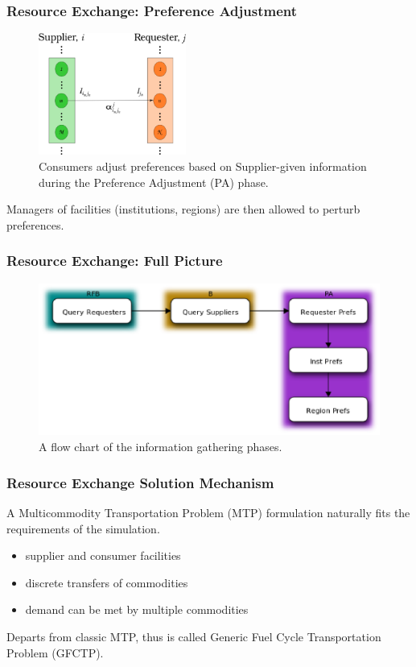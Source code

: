 \begin{frame}[ctb!]
  \frametitle{Resource Exchange: Preference Adjustment}
  \begin{figure}
    \includegraphics[height=4cm]{./images/supplier-requester.eps}
    \caption{Consumers adjust preferences based on Supplier-given information
      during the Preference Adjustment (PA) phase.}
  \end{figure}

  Managers of facilities (institutions, regions) are then allowed to perturb
  preferences.
\end{frame}

\begin{frame}[ctb!]
  \frametitle{Resource Exchange: Full Picture}
  \begin{figure}
    \includegraphics[height=5cm]{./images/exchange.eps}
    \caption{A flow chart of the information gathering phases.}
  \end{figure}
\end{frame}

\begin{frame}[ctb!]
  \frametitle{Resource Exchange Solution Mechanism}

  A Multicommodity Transportation Problem (MTP) formulation naturally fits the
  requirements of the simulation.

  \begin{itemize}
    \item supplier and consumer facilities
    \item discrete transfers of commodities
    \item demand can be met by multiple commodities
  \end{itemize}

  Departs from classic MTP, thus is called Generic Fuel Cycle Transportation
  Problem (GFCTP).
  
\end{frame}

